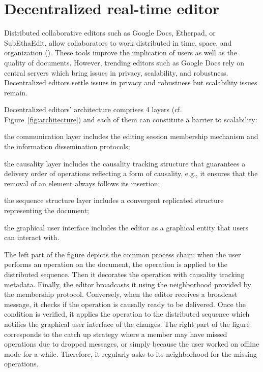 
\section{Decentralized real-time editor}
\label{sec:editor}

Distributed collaborative editors such as Google Docs, Etherpad, or SubEthaEdit,
allow collaborators to work distributed in time, space, and organization
(\REF). These tools improve the implication of users as well as the quality of
documents. However, trending editors such as Google Docs rely on central servers
which bring issues in privacy, scalability, and robustness. Decentralized
editors settle issues in privacy and robustness but scalability issues remain.

Decentralized editors' architecture comprises 4 layers
(cf. Figure~\ref{fig:architecture}) and each of them can constitute a barrier to
scalability:
\begin{inparaenum}[(i)]
\item the communication layer includes the editing session membership mechanism
  and the information dissemination protocols;
\item the causality layer includes the causality tracking structure that
  guarantees a delivery order of operations reflecting a form of causality,
  e.g., it ensures that the removal of an element always follows its insertion;
\item the sequence structure layer includes a convergent replicated structure
  representing the document;
\item the graphical user interface includes the editor as a graphical entity
  that users can interact with. %
\end{inparaenum}

The left part of the figure depicts the common process chain: when the user
performs an operation on the document, the operation is applied to the
distributed sequence. Then it decorates the operation with causality tracking
metadata. Finally, the editor broadcasts it using the neighborhood provided by
the membership protocol.  Conversely, when the editor receives a broadcast
message, it checks if the operation is causally ready to be delivered. Once the
condition is verified, it applies the operation to the distributed sequence
which notifies the graphical user interface of the changes.  The right part of
the figure corresponds to the catch up strategy where a member may have missed
operations due to dropped messages, or simply because the user worked on offline
mode for a while. Therefore, it regularly asks to its neighborhood for the
missing operations.


